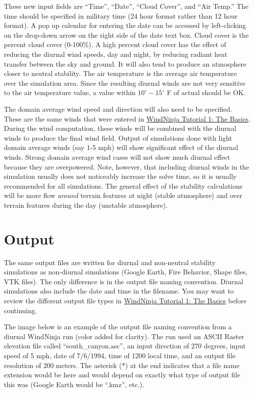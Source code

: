 \documentclass[12pt]{article}
\begin{document}
These new input fields are “Time”, “Date”, “Cloud Cover”, and “Air Temp.”  The time should be specified in military time (24 hour format rather than 12 hour format).  A pop up calendar for entering the date can be accessed by left-clicking on the drop-down arrow on the right side of the date text box.  Cloud cover is the percent cloud cover (0-100\%).  A high percent cloud cover has the effect of reducing the diurnal wind speeds, day and night, by reducing radiant heat transfer between the sky and ground.  It will also tend to produce an atmosphere closer to neutral stability. The air temperature is the average air temperature over the simulation area.  Since the resulting diurnal winds are not very sensitive to the air temperature value, a value within $10^{\circ} - 15^{\circ}$ F of actual should be OK.

The domain average wind speed and direction will also need to be specified.  These are the same winds that were entered in \href{http://firelab.github.io/windninja/pdf/WindNinja_tutorial1.pdf}{WindNinja Tutorial 1: The Basics}.  During the wind computation, these winds will be combined with the diurnal winds to produce the final wind field.  Output of simulations done with light domain average winds (say 1-5 mph) will show significant effect of the diurnal winds.  Strong domain average wind cases will not show much diurnal effect because they are overpowered.  Note, however, that including diurnal winds in the simulation usually does not noticeably increase the solve time, so it is usually recommended for all simulations.  The general effect of the stability calculations will be more flow \textit{around} terrain features at night (stable atmosphere) and over terrain features during the day (unstable atmosphere).

\section{Output}

The same output files are written for diurnal and non-neutral stability simulations as non-diurnal simulations (Google Earth, Fire Behavior, Shape files, VTK files).  The only difference is in the output file naming convention.  Diurnal simulations also include the date and time in the filename.  You may want to review the different output file types in \href{http://firelab.github.io/windninja/pdf/WindNinja_tutorial1.pdf}{WindNinja Tutorial 1: The Basics} before continuing.

The image below is an example of the output file naming convention from a diurnal WindNinja run (color added for clarity).  The run used an ASCII Raster elevation file called “south\_canyon.asc”, an input direction of 270 degrees, input speed of 5 mph, date of 7/6/1994, time of 1200 local time, and an output file resolution of 200 meters.  The asterisk (*) at the end indicates that a file name extension would be here and would depend on exactly what type of output file this was (Google Earth would be “.kmz”, etc.).
\end{document}
